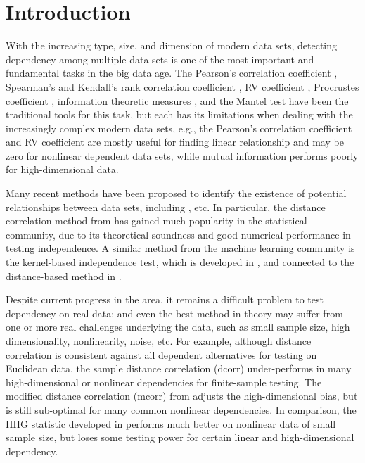 \documentclass[11pt]{article}
\begin{document}
\newpage
{}

\section{Introduction}
With the increasing type, size, and dimension of modern data sets, detecting dependency among multiple data sets is one of the most important and fundamental tasks in the big data age. The Pearson's correlation coefficient \cite{Pearson1895}, Spearman's and Kendall's rank correlation coefficient \cite{KendallBook}, RV coefficient \cite{RobertEscoufier1976}, Procrustes coefficient \cite{GowerProcrustesBook}, information theoretic measures \cite{Renyi1959}, and the Mantel test \cite{Mantel1967} have been the traditional tools for this task, but each has its limitations when dealing with the increasingly complex modern data sets, e.g., the Pearson's correlation coefficient and RV coefficient are mostly useful for finding linear relationship and may be zero for nonlinear dependent data sets, while mutual information performs poorly for high-dimensional data. 

Many recent methods have been proposed to identify the existence of potential relationships between data sets, including \cite{Baringhaus2004,TaskinenOjaRandles2005, GrettonEtAl2005, SzekelyRizzoBakirov2007, GrettonGyorfi2010,Reshef2011, HellerGorfine2013, Reimherr2013, SzekelyRizzo2013a, SzekelyRizzo2013b, RizzoSzekely2016}, etc. In particular, the distance correlation method from \cite{SzekelyRizzoBakirov2007, SzekelyRizzo2009, SzekelyRizzo2013a, SzekelyRizzo2014} has gained much popularity in the statistical community, due to its theoretical soundness and good numerical performance in testing independence. A similar method from the machine learning community is the kernel-based independence test, which is developed in \cite{GrettonEtAl2005, GrettonGyorfi2010, GrettonEtAl2012}, and connected to the distance-based method in \cite{SejdinovicEtAl2013}.

Despite  current progress in the area, it remains a difficult problem to test dependency on real data; and even the best method in theory may suffer from one or more real challenges underlying the data, such as small sample size, high dimensionality, nonlinearity, noise, etc. For example, although distance correlation is consistent against all dependent alternatives for testing on Euclidean data, the sample distance correlation (dcorr) under-performs in many high-dimensional or nonlinear dependencies for finite-sample testing. The modified distance correlation (mcorr) from \cite{SzekelyRizzo2013a} adjusts the high-dimensional bias, but is still sub-optimal for many common nonlinear dependencies. In comparison, the HHG statistic developed in \cite{HellerGorfine2013} performs much better on nonlinear data of small sample size, but  loses some testing power for certain linear and high-dimensional dependency.
\end{document}
